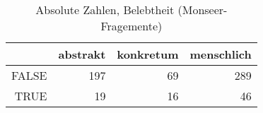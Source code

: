\begin{table}[ht]
\centering
\begin{tabular}{rrrr}
  \hline
 & abstrakt & konkretum & menschlich \\ 
  \hline
FALSE & 197 &  69 & 289 \\ 
  TRUE &  19 &  16 &  46 \\ 
   \hline
\end{tabular}
\caption{Absolute Zahlen, Belebtheit  (Monseer-Fragemente)} 
\end{table}
